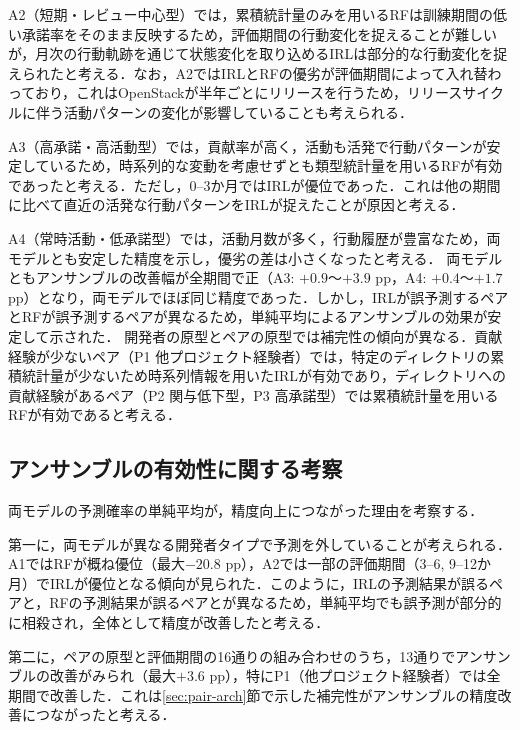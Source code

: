 \documentclass[submit,noauthor,ses,dvipdfmx]{ipsj}
\begin{document}
A2（短期・レビュー中心型）では，累積統計量のみを用いるRFは訓練期間の低い承諾率をそのまま反映するため，評価期間の行動変化を捉えることが難しいが，月次の行動軌跡を通じて状態変化を取り込めるIRLは部分的な行動変化を捉えられたと考える．なお，A2ではIRLとRFの優劣が評価期間によって入れ替わっており，これはOpenStackが半年ごとにリリースを行うため，リリースサイクルに伴う活動パターンの変化が影響していることも考えられる．

A3（高承諾・高活動型）では，貢献率が高く，活動も活発で行動パターンが安定しているため，時系列的な変動を考慮せずとも類型統計量を用いるRFが有効であったと考える．ただし，0--3か月ではIRLが優位であった．これは他の期間に比べて直近の活発な行動パターンをIRLが捉えたことが原因と考える．

A4（常時活動・低承諾型）では，活動月数が多く，行動履歴が豊富なため，両モデルとも安定した精度を示し，優劣の差は小さくなったと考える．
両モデルともアンサンブルの改善幅が全期間で正（A3: $+0.9$〜$+3.9$ pp，A4: $+0.4$〜$+1.7$ pp）となり，両モデルでほぼ同じ精度であった．しかし，IRLが誤予測するペアとRFが誤予測するペアが異なるため，単純平均によるアンサンブルの効果が安定して示された．
開発者の原型とペアの原型では補完性の傾向が異なる．貢献経験が少ないペア（P1 他プロジェクト経験者）では，特定のディレクトリの累積統計量が少ないため時系列情報を用いたIRLが有効であり，ディレクトリへの貢献経験があるペア（P2 関与低下型，P3 高承諾型）では累積統計量を用いるRFが有効であると考える．

\vspace{-3mm}
\subsection{アンサンブルの有効性に関する考察}
両モデルの予測確率の単純平均が，精度向上につながった理由を考察する．

第一に，両モデルが異なる開発者タイプで予測を外していることが考えられる．A1ではRFが概ね優位（最大$-20.8$ pp），A2では一部の評価期間（3--6, 9--12か月）でIRLが優位となる傾向が見られた．このように，IRLの予測結果が誤るペアと，RFの予測結果が誤るペアとが異なるため，単純平均でも誤予測が部分的に相殺され，全体として精度が改善したと考える．

第二に，ペアの原型と評価期間の16通りの組み合わせのうち，13通りでアンサンブルの改善がみられ（最大$+3.6$ pp），特にP1（他プロジェクト経験者）では全期間で改善した．これは\ref{sec:pair-arch}節で示した補完性がアンサンブルの精度改善につながったと考える．
\vspace{-2mm}
\end{document}
